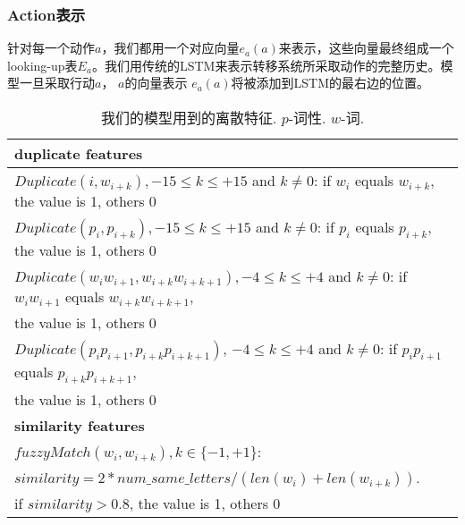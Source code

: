 \subsubsection*{Action表示} 针对每一个动作$a$，我们都用一个对应向量$e_a(a)$来表示，这些向量最终组成一个looking-up表$E_a$。我们用传统的LSTM来表示转移系统所采取动作的完整历史。模型一旦采取行动$a$， $a$的向量表示 $e_a(a)$将被添加到LSTM的最右边的位置。

\begin{table}[htbp]
	\centering
	\small
	\renewcommand{\arraystretch}{1.1}
	\begin{tabular}{l}
		\hline
		\bf duplicate features  \\
		\hline
		$Duplicate({i}, w_{i+k}), -15 \leq k \leq +15$ and $k \neq 0$: if $w_{i}$ equals $w_{i+k}$, the value is 1, others 0 \\
		$Duplicate(p_{i}, p_{i+k}), -15 \leq k \leq +15$ and $k \neq 0$: if $p_{i}$ equals $p_{i+k}$, the value is 1, others 0 \\
		$Duplicate(w_{i}w_{i+1}, w_{i+k}w_{i+k+1}), -4 \leq k \leq +4$ and $k \neq 0$: if $w_{i}w_{i+1}$ equals $w_{i+k}w_{i+k+1}$, \\ \qquad \qquad \qquad \qquad \qquad \qquad \qquad \qquad \qquad \qquad the value is 1, others 0 \\
		$Duplicate(p_{i}p_{i+1}, p_{i+k}p_{i+k+1})$, $-4 \leq k \leq +4$ and $k \neq 0$: if $p_{i}p_{i+1}$ equals $p_{i+k}p_{i+k+1}$, \\ \qquad \qquad \qquad \qquad \qquad \qquad \qquad \qquad \qquad \qquad the value is 1, others 0 \\
		
		\hline
		\bf similarity features \\
		\hline
		$fuzzyMatch(w_{i}, w_{i+k}), k \in \{-1,+1\} $:  \\ \qquad \qquad \qquad \qquad \qquad \qquad \qquad $similarity = 2*num\_same\_letters/(len(w_{i}) + len(w_{i+k}))$.\\ \qquad \qquad \qquad \qquad \qquad \qquad \qquad if $similarity > 0.8$, the value is 1, others 0 \\
		\hline	
	\end{tabular}
	\caption{我们的模型用到的离散特征. $p$-词性. $w$-词. }
	
	\label{tbl:discrete-feature}
	\vspace{-0.5em}
\end{table}

